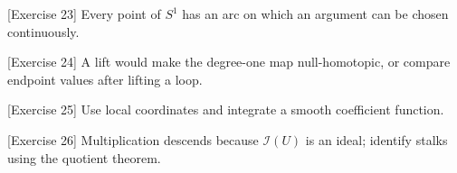 \begin{hint}
[Exercise 23]
Every point of $S^1$ has an arc on which an argument can be chosen continuously.
\end{hint}

\begin{hint}
[Exercise 24]
A lift would make the degree-one map null-homotopic, or compare endpoint values after lifting a loop.
\end{hint}

\begin{hint}
[Exercise 25]
Use local coordinates and integrate a smooth coefficient function.
\end{hint}

\begin{hint}
[Exercise 26]
Multiplication descends because $\mathcal I(U)$ is an ideal; identify stalks using the quotient theorem.
\end{hint}
